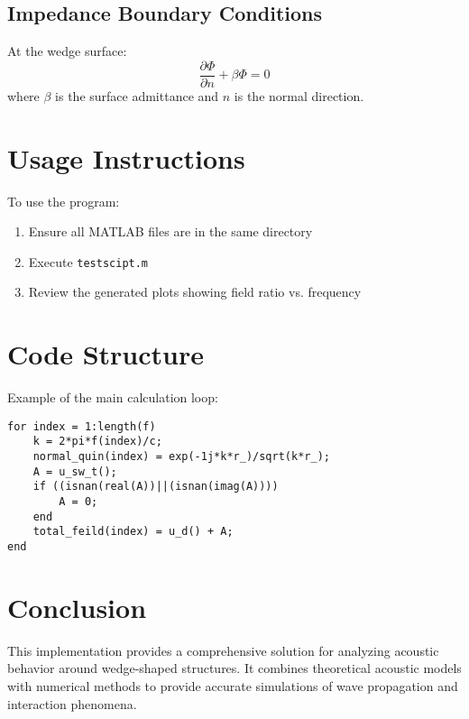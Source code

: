 \documentclass[12pt,a4paper]{article}
\begin{document}
\subsection{Impedance Boundary Conditions}
At the wedge surface:
\begin{equation}
    \frac{\partial \Phi}{\partial n} + \beta\Phi = 0
\end{equation}
where $\beta$ is the surface admittance and $n$ is the normal direction.

\section{Usage Instructions}
To use the program:

\begin{enumerate}
    \item Ensure all MATLAB files are in the same directory
    \item Execute \texttt{testscipt.m}
    \item Review the generated plots showing field ratio vs. frequency
\end{enumerate}

\section{Code Structure}
Example of the main calculation loop:

\begin{lstlisting}[style=matlab]
for index = 1:length(f)
    k = 2*pi*f(index)/c;
    normal_quin(index) = exp(-1j*k*r_)/sqrt(k*r_);
    A = u_sw_t();
    if ((isnan(real(A))||(isnan(imag(A))))
        A = 0;
    end
    total_feild(index) = u_d() + A;
end
\end{lstlisting}

\section{Conclusion}
This implementation provides a comprehensive solution for analyzing acoustic behavior around wedge-shaped structures. It combines theoretical acoustic models with numerical methods to provide accurate simulations of wave propagation and interaction phenomena.
\end{document}
